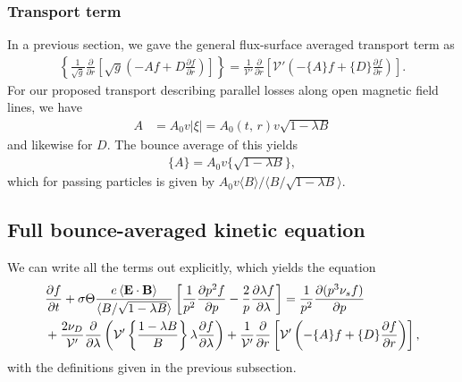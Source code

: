 \documentclass[11pt,a4paper]{article}
\renewcommand{\b}[1]{\ensuremath{ {\bf #1 } }}
\begin{document}
\subsubsection*{Transport term}
In a previous section, we gave the general flux-surface averaged transport term as
\begin{align}
\left\{\frac{1}{\sqrt{g}}\frac{\partial}{\partial r}\left[ \sqrt{g}\left( -Af+D\frac{\partial f}{\partial r}\right)\right]\right\} = \frac{1}{\mathcal{V}'}\frac{\partial}{\partial r}\left[ \mathcal{V'}\left(-\{A\}f+ \{D\}\frac{\partial f}{\partial r} \right) \right].
\end{align}
For our proposed transport describing parallel losses along open magnetic field lines, we have
\begin{align}
A &= A_0 v |\xi| = A_0(t,\,r) v \sqrt{1-\lambda B}
\end{align}
and likewise for $D$. The bounce average of this yields
\begin{align}
\{A\} = A_0 v \{\sqrt{1-\lambda B}\},
\end{align}
which for passing particles is given by  $A_0 v \langle B \rangle/\langle B/\sqrt{1-\lambda B}\rangle$.


\subsection{Full bounce-averaged kinetic equation}
We can write all the terms out explicitly, which yields the equation
\begin{align}
\frac{\partial f}{\partial t} &+ \sigma \Theta \frac{e \left\langle \b{E}\cdot\b{B}\right\rangle}{\langle B/\sqrt{1-\lambda B} \rangle}\left[\frac{1}{p^2}\frac{\partial p^2 f}{\partial p}  - \frac{2}{p}\frac{\partial \lambda f}{\partial \lambda}\right]  = \frac{1}{p^2}\frac{\partial(p^3 \nu_s f)}{\partial p} \nonumber \\
&\hspace{-5mm}+ \frac{2\nu_D}{\mathcal{V}'}\frac{\partial}{\partial \lambda}\left(  \mathcal{V'}\left\{\frac{1-\lambda B}{B}\right\} \lambda\frac{\partial f}{\partial \lambda}\right)+\frac{1}{\mathcal{V}'}\frac{\partial}{\partial r}\left[ \mathcal{V'}\left(-\{A\}f+ \{D\}\frac{\partial f}{\partial r} \right) \right],
\label{eq:full bounce averaged}
\end{align}
with the definitions given in the previous subsection.
\end{document}

